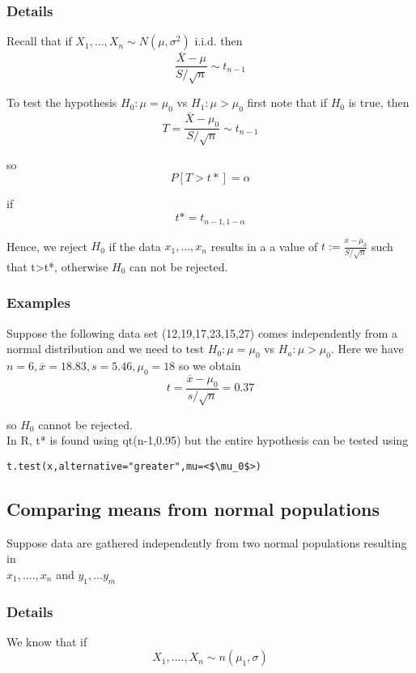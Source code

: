 \documentclass[12pt,a4paper]{article}
\theoremstyle{regla}
\theoremstyle{remark}
\theoremstyle{definition}
\theoremstyle{nonumberbreak}
\begin{document}
\subsubsection{Details}
Recall that if $X_1,\ldots,X_n \sim N(\mu,\sigma^2)$ i.i.d. then $$\frac{\overline{X}-\mu}{S/\sqrt{n}}\sim t_{n-1}$$

To test the hypothesis $H_0:\mu=\mu_{0}$ vs $H_1:\mu > \mu_{0}$ first note that if $H_0$ is true, then 
$$T= \frac{\overline{X}-\mu_{0}}{S/\sqrt{n}} \sim t_{n-1}$$

so $$P[T>t*]=\alpha$$

if $$t*=t_{n-1,1-\alpha}$$

Hence, we reject $H_0$ if the data $x_1,...,x_n$ results in a a value of 
$t:=\frac{\overline{x}-\mu_0}{S/\sqrt{n}}$ such that t>t*, otherwise $H_0$ can not be rejected. 
\subsubsection{Examples}
\begin{xmpl}
 Suppose the following data set (12,19,17,23,15,27) comes independently from a normal distribution and we need to test $H_0:\mu=\mu_0$ vs $H_a:\mu>\mu_0$. Here we have $n=6,\overline{x}=18.83, s=5.46, \mu_0=18$ so we obtain
$$t=\frac{\overline{x}-\mu_0}{s/\sqrt{n}}= 0.37$$

so $H_0$ cannot be rejected.\\

In R, t* is found using qt(n-1,0.95) but the entire hypothesis can be tested using
\begin{lstlisting}
t.test(x,alternative="greater",mu=<$\mu_0$>)
\end{lstlisting}
\end{xmpl}

\subsection{Comparing means from normal populations}
\begin{fbox}
\begin{minipage}{0.97\textwidth}
Suppose data are gathered independently from two normal populations resulting in \\
$x_1,....,x_n$    and       $y_1,...y_m$
\end{minipage}
\end{fbox}
\subsubsection{Details}
We know that if\\ 
$$X_1, ...., X_n \sim n(\mu_1,\sigma)$$
\end{document}
